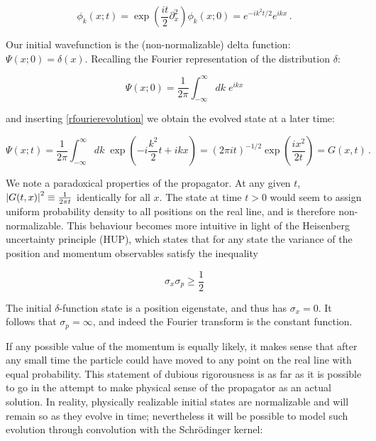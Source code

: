 \documentclass{article}
\begin{document}
\begin{equation}
    \label{rfourierevolution}
    \phi_k(x; t) = \exp(\frac{it}{2}\partial_x^2) \phi_k(x;0) = e^{-ik^{2}t/2} e^{ikx}\,.
\end{equation}

Our initial wavefunction is the (non-normalizable) delta function: $\Psi(x;0) = \delta(x)$. Recalling the Fourier representation of the distribution $\delta$:

\begin{equation}
    \Psi(x;0) = \frac{1}{2\pi} \int_{-\infty}^\infty dk \; e^{ikx} 
\end{equation}

and inserting \eqref{rfourierevolution} we obtain the evolved state at a later time:

\begin{equation}
    \Psi(x;t) = \frac{1}{2\pi} \int_{-\infty}^{\infty} dk \; \exp( - i \frac{k^2}{2}t +  ikx ) = (2 \pi i t)^{-1/2} \exp(\frac{ix^2}{2t}) = G(x,t)\,.
\end{equation}

We note a paradoxical properties of the propagator. At any given $t$, $\abs{G(t,x)}^2 \equiv \frac{1}{2\pi t}$ identically for all $x$. The state at time $t>0$ would seem to assign uniform probability density to all positions on the real line, and is therefore non-normalizable. This behaviour becomes more intuitive in light of the Heisenberg uncertainty principle (HUP), which states that for any state the variance of the position and momentum observables satisfy the inequality

\begin{equation}
    \sigma_x \sigma_p \geq \frac{1}{2}
\end{equation}

The initial $\delta$-function state is a position eigenstate, and thus has $\sigma_x = 0$. It follows that $\sigma_p = \infty$, and indeed the Fourier transform is the constant function.

If any possible value of the momentum is equally likely, it makes sense that after any small time the particle could have moved to any point on the real line with equal probability. This statement of dubious rigorousness is as far as it is possible to go in the attempt to make physical sense of the propagator as an actual solution. In reality, physically realizable initial states are normalizable and will remain so as they evolve in time; nevertheless it will be possible to model such evolution through convolution with the Schr\"odinger kernel:
\end{document}
